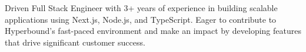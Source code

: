 \documentclass[letter,10pt]{article}
\begin{document}
Driven Full Stack Engineer with 3+ years of experience in building scalable applications using Next.js, Node.js, and TypeScript. Eager to contribute to Hyperbound's fast-paced environment and make an impact by developing features that drive significant customer success.
\end{document}
